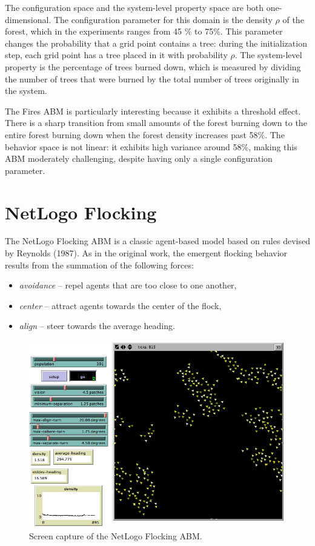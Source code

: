 The configuration space and the system-level property space are both one-dimensional.
The configuration parameter for this domain is the density $\rho$ of the forest, which in the experiments ranges from 45 \% to 75\%.
This parameter changes the probability that a grid point contains a tree:
during the initialization step, each grid point has a tree placed in it with probability $\rho$.
The system-level property is the percentage of trees burned down, which is measured by dividing the number of trees that were burned by the total number of trees originally in the system.


The Fires ABM is particularly interesting because it exhibits a threshold effect.
There is a sharp transition from small amounts of the forest burning down to the entire forest burning down when the forest density increases past 58\%.
The behavior space is not linear: it exhibits high variance around 58\%, making this ABM moderately challenging, despite having only a single configuration parameter.


 \section{NetLogo Flocking}

The NetLogo Flocking ABM is a classic agent-based model based on rules devised by Reynolds (1987)\nocite{reynolds1987}.
As in the original work, the emergent flocking behavior results from the summation of the following forces:
\begin{itemize}
	\item \textit{avoidance} -- repel agents that are too close to one another,
	\item \textit{center} -- attract agents towards the center of the flock,
	\item \textit{align} -- steer towards the average heading.
\end{itemize}

\begin{figure}[ht]
\centering
\includegraphics[scale=.5]{images/flocking_ss.png}
\caption{Screen capture of the NetLogo Flocking ABM.}
\label{fig:flockingss}
\end{figure}


